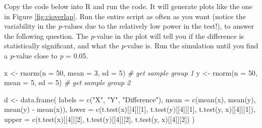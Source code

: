 \documentclass[
  oneside]{book}
\newenvironment{Shaded}{\begin{snugshade}}{\end{snugshade}}
\newcommand{\AttributeTok}[1]{\textcolor[rgb]{0.77,0.63,0.00}{#1}}
\newcommand{\CommentTok}[1]{\textcolor[rgb]{0.56,0.35,0.01}{\textit{#1}}}
\newcommand{\DecValTok}[1]{\textcolor[rgb]{0.00,0.00,0.81}{#1}}
\newcommand{\FunctionTok}[1]{\textcolor[rgb]{0.00,0.00,0.00}{#1}}
\newcommand{\NormalTok}[1]{#1}
\newcommand{\OtherTok}[1]{\textcolor[rgb]{0.56,0.35,0.01}{#1}}
\newcommand{\SpecialCharTok}[1]{\textcolor[rgb]{0.00,0.00,0.00}{#1}}
\newcommand{\StringTok}[1]{\textcolor[rgb]{0.31,0.60,0.02}{#1}}
\begin{document}
Copy the code below into R and run the code. It will generate plots like the one in Figure \ref{fig:cioverlap}. Run the entire script as often as you want (notice the variability in the \emph{p}-values due to the relatively low power in the test!), to answer the following question. The \emph{p}-value in the plot will tell you if the difference is statistically significant, and what the \emph{p}-value is. Run the simulation until you find a \emph{p}-value close to \emph{p} = 0.05.

\begin{Shaded}
\begin{Highlighting}[]
\NormalTok{x }\OtherTok{\textless{}{-}} \FunctionTok{rnorm}\NormalTok{(}\AttributeTok{n =} \DecValTok{50}\NormalTok{, }\AttributeTok{mean =} \DecValTok{3}\NormalTok{, }\AttributeTok{sd =} \DecValTok{5}\NormalTok{) }\CommentTok{\# get sample group 1}
\NormalTok{y }\OtherTok{\textless{}{-}} \FunctionTok{rnorm}\NormalTok{(}\AttributeTok{n =} \DecValTok{50}\NormalTok{, }\AttributeTok{mean =} \DecValTok{5}\NormalTok{, }\AttributeTok{sd =} \DecValTok{5}\NormalTok{) }\CommentTok{\# get sample group 2}

\NormalTok{d }\OtherTok{\textless{}{-}} \FunctionTok{data.frame}\NormalTok{(}
  \AttributeTok{labels =} \FunctionTok{c}\NormalTok{(}\StringTok{"X"}\NormalTok{, }\StringTok{"Y"}\NormalTok{, }\StringTok{"Difference"}\NormalTok{),}
  \AttributeTok{mean =} \FunctionTok{c}\NormalTok{(}\FunctionTok{mean}\NormalTok{(x), }\FunctionTok{mean}\NormalTok{(y), }\FunctionTok{mean}\NormalTok{(y) }\SpecialCharTok{{-}} \FunctionTok{mean}\NormalTok{(x)),}
  \AttributeTok{lower =} \FunctionTok{c}\NormalTok{(}\FunctionTok{t.test}\NormalTok{(x)[[}\DecValTok{4}\NormalTok{]][}\DecValTok{1}\NormalTok{], }\FunctionTok{t.test}\NormalTok{(y)[[}\DecValTok{4}\NormalTok{]][}\DecValTok{1}\NormalTok{], }\FunctionTok{t.test}\NormalTok{(y, x)[[}\DecValTok{4}\NormalTok{]][}\DecValTok{1}\NormalTok{]),}
  \AttributeTok{upper =} \FunctionTok{c}\NormalTok{(}\FunctionTok{t.test}\NormalTok{(x)[[}\DecValTok{4}\NormalTok{]][}\DecValTok{2}\NormalTok{], }\FunctionTok{t.test}\NormalTok{(y)[[}\DecValTok{4}\NormalTok{]][}\DecValTok{2}\NormalTok{], }\FunctionTok{t.test}\NormalTok{(y, x)[[}\DecValTok{4}\NormalTok{]][}\DecValTok{2}\NormalTok{])}
\NormalTok{)}


\end{Highlighting}
\end{Shaded}
\end{document}
